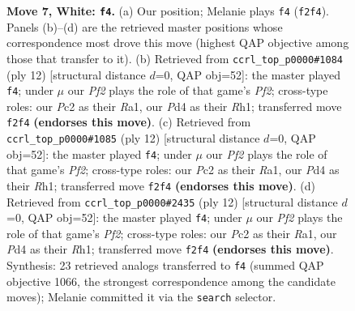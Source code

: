 \documentclass[11pt]{article}
\begin{document}
\begin{figure}[p]
\caption{\textbf{Move 7, White: \texttt{f4}.} (a) Our position; Melanie plays \texttt{f4} (\texttt{f2f4}). Panels (b)--(d) are the retrieved master positions whose correspondence most drove this move (highest QAP objective among those that transfer to it). (b) Retrieved from \texttt{ccrl\_top\_p0000\#1084} (ply 12) [structural distance $d$=0, QAP obj=52]: the master played \texttt{f4}; under $\mu$ our \emph{Pf2} plays the role of that game's \emph{Pf2}; cross-type roles: our \emph{P}c2 as their \emph{R}a1, our \emph{P}d4 as their \emph{R}h1; transferred move \texttt{f2f4} \textbf{(endorses this move)}. (c) Retrieved from \texttt{ccrl\_top\_p0000\#1085} (ply 12) [structural distance $d$=0, QAP obj=52]: the master played \texttt{f4}; under $\mu$ our \emph{Pf2} plays the role of that game's \emph{Pf2}; cross-type roles: our \emph{P}c2 as their \emph{R}a1, our \emph{P}d4 as their \emph{R}h1; transferred move \texttt{f2f4} \textbf{(endorses this move)}. (d) Retrieved from \texttt{ccrl\_top\_p0000\#2435} (ply 12) [structural distance $d$=0, QAP obj=52]: the master played \texttt{f4}; under $\mu$ our \emph{Pf2} plays the role of that game's \emph{Pf2}; cross-type roles: our \emph{P}c2 as their \emph{R}a1, our \emph{P}d4 as their \emph{R}h1; transferred move \texttt{f2f4} \textbf{(endorses this move)}. Synthesis: 23 retrieved analogs transferred to \texttt{f4} (summed QAP objective 1066, the strongest correspondence among the candidate moves); Melanie committed it via the \texttt{search} selector.}
\label{fig:thought-m12}
\end{figure}

\clearpage
\end{document}

